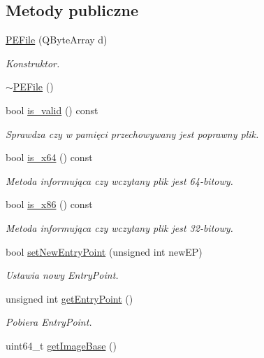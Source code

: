 \subsection*{Metody publiczne}
\begin{DoxyCompactItemize}
\item 
\hyperlink{class_p_e_file_ae8d99a8a0dabc4891ba5f7ef5031bcdc}{P\-E\-File} (Q\-Byte\-Array d)
\begin{DoxyCompactList}\small\item\em Konstruktor. \end{DoxyCompactList}\item 
\hyperlink{class_p_e_file_a0e63ccc46a77ddc9106e98c9131674db}{$\sim$\-P\-E\-File} ()
\item 
bool \hyperlink{class_p_e_file_a90a96d95f9d67ff48bf12ffcb0f22d41}{is\-\_\-valid} () const 
\begin{DoxyCompactList}\small\item\em Sprawdza czy w pamięci przechowywany jest poprawny plik. \end{DoxyCompactList}\item 
bool \hyperlink{class_p_e_file_aa8e69bdca4d00216df406278b4e96a28}{is\-\_\-x64} () const 
\begin{DoxyCompactList}\small\item\em Metoda informująca czy wczytany plik jest 64-\/bitowy. \end{DoxyCompactList}\item 
bool \hyperlink{class_p_e_file_a371cc84eed9dd5d85b7c50d60c1eb56f}{is\-\_\-x86} () const 
\begin{DoxyCompactList}\small\item\em Metoda informująca czy wczytany plik jest 32-\/bitowy. \end{DoxyCompactList}\item 
bool \hyperlink{class_p_e_file_a31cab72915687c9138e804e644f80ac6}{set\-New\-Entry\-Point} (unsigned int new\-E\-P)
\begin{DoxyCompactList}\small\item\em Ustawia nowy Entry\-Point. \end{DoxyCompactList}\item 
unsigned int \hyperlink{class_p_e_file_a82c9e3280a60fbdf13e7a7b7dbbf9ddb}{get\-Entry\-Point} ()
\begin{DoxyCompactList}\small\item\em Pobiera Entry\-Point. \end{DoxyCompactList}\item 
uint64\-\_\-t \hyperlink{class_p_e_file_ac3bf74a6efbc10bd642fbb345e71bf2d}{get\-Image\-Base} ()

\end{DoxyCompactItemize}
